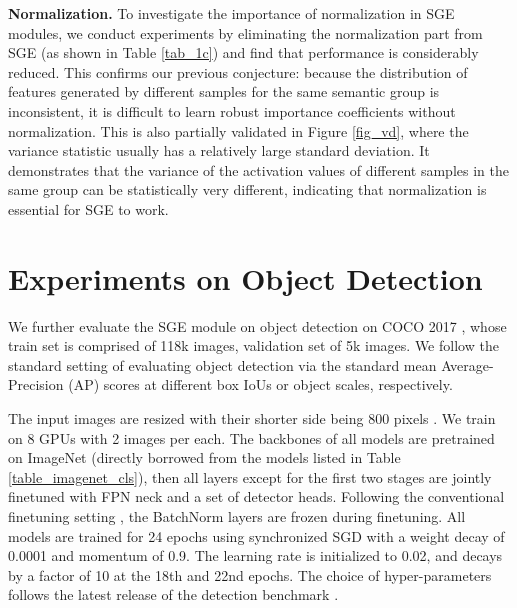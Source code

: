 \documentclass{article}
\begin{document}
	\textbf{Normalization. } To investigate the importance of normalization in SGE modules, we conduct experiments by eliminating the normalization part from SGE (as shown in Table \ref{tab_1c}) and find that performance is considerably reduced. This confirms our previous conjecture: because the distribution of features generated by different samples for the same semantic group is inconsistent, it is difficult to learn robust importance coefficients without normalization. This is also partially validated in Figure \ref{fig_vd}, where the variance statistic usually has a relatively large standard deviation. It demonstrates that the variance of the activation values of different samples in the same group can be statistically very different, indicating that normalization is essential for SGE to work.
	
	\section{Experiments on Object Detection}
	We further evaluate the SGE module on object detection on COCO 2017 \cite{lin2014microsoft}, whose train set is comprised of 118k images, validation set of 5k images. We follow the standard setting \cite{he2017mask} of evaluating object detection via the standard mean Average-Precision (AP) scores at different box IoUs or object scales, respectively. 
	
	The input images are resized with their shorter side being 800 pixels \cite{lin2017feature}. We train on 8 GPUs with 2 images per each. The backbones of all models are pretrained on ImageNet \cite{russakovsky2015imagenet} (directly borrowed from the models listed in Table \ref{table_imagenet_cls}), then all layers except for the first two stages are jointly finetuned with FPN \cite{lin2017feature} neck and a set of detector heads. Following the conventional finetuning setting \cite{he2017mask}, the BatchNorm layers are frozen during finetuning. All models are trained for 24 epochs using synchronized SGD with a weight decay of 0.0001 and momentum of 0.9. The learning rate is initialized to 0.02, and decays by a factor of 10 at the 18th and 22nd epochs. The choice of hyper-parameters follows the latest release of the detection benchmark \cite{mmdetection2018}.
	
\end{document}
